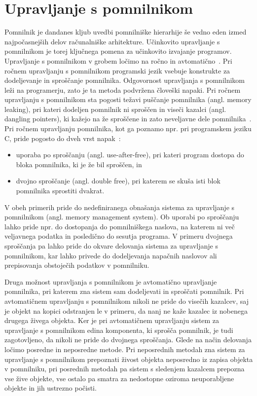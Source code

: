 \section{Upravljanje s pomnilnikom}

Pomnilnik je dandanes kljub uvedbi pomnilniške hierarhije še vedno eden izmed najpočasnejših delov računalniške arhitekture. Učinkovito upravljanje s pomnilnikom je torej ključnega pomena za učinkovito izvajanje programov. Upravljanje s pomnilnikom v grobem ločimo na ročno in avtomatično~\cite{jones2023garbage}. Pri ročnem upravljanju s pomnilnikom programski jezik vsebuje konstrukte za dodeljevanje in sproščanje pomnilnika. Odgovornost upravljanja s pomnilnikom leži na programerju, zato je ta metoda podvržena človeški napaki. Pri ročnem upravljanju s pomnilnikom sta pogosti težavi puščanje pomnilnika (angl. memory leaking), pri kateri dodeljen pomnilnik ni sproščen in viseči kazalci (angl. dangling pointers), ki kažejo na že sproščene in zato neveljavne dele pomnilnika~\cite{jones2023garbage}. Pri ročnem upravljanju pomnilnika, kot ga poznamo npr. pri programskem jeziku C, pride pogosto do dveh vrst napak~\cite{jones2023garbage}:

\begin{itemize}
	\itemsep 0em
	\item uporaba po sproščanju (angl. use-after-free), pri kateri program dostopa do bloka pomnilnika, ki je že bil sproščen, in
	\item dvojno sproščanje (angl. double free), pri katerem se skuša isti blok pomnilnika sprostiti dvakrat.
\end{itemize}

V obeh primerih pride do nedefiniranega obnašanja sistema za upravljanje s pomnilnikom (angl. memory management system). Ob uporabi po sproščanju lahko pride npr. do dostopanja do pomnilniškega naslova, na katerem ni več veljavnega podatka in posledično do sesutja programa. V primeru dvojnega sproščanja pa lahko pride do okvare delovanja sistema za upravljanje s pomnilnikom, kar lahko privede do dodeljevanja napačnih naslovov ali prepisovanja obstoječih podatkov v pomnilniku.

Druga možnost upravljanja s pomnilnikom je avtomatično upravljanje pomnilnika, pri katerem zna sistem sam dodeljevati in sproščati pomnilnik. Pri avtomatičnem upravljanju s pomnilnikom nikoli ne pride do visečih kazalcev, saj je objekt na kopici odstranjen le v primeru, da nanj ne kaže kazalec iz nobenega drugega živega objekta. Ker je pri avtomatičnem upravljanju sistem za upravljanje s pomnilnikom edina komponenta, ki sprošča pomnilnik, je tudi zagotovljeno, da nikoli ne pride do dvojnega sproščanja. Glede na način delovanja ločimo posredne in neposredne metode. Pri neposrednih metodah zna sistem za upravljanje s pomnilnikom prepoznati živost objekta neposredno iz zapisa objekta v pomnilniku, pri posrednih metodah pa sistem s sledenjem kazalcem prepozna vse žive objekte, vse ostalo pa smatra za nedostopne oziroma neuporabljene objekte in jih ustrezno počisti.

